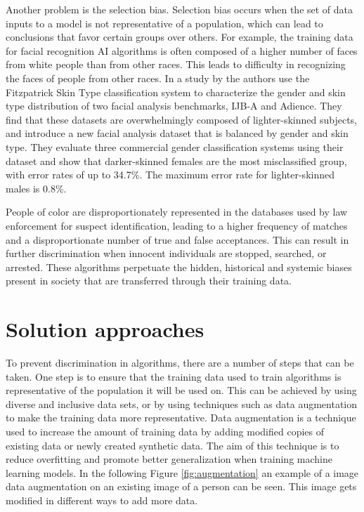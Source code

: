 \documentclass[
	12pt,
    a4paper,
    egregdoesnotlikesansseriftitles, %
    toc=chapterentrywithdots,
    oneside, openany,
    titlepage,
    parskip=half,
    headings=normal,  %
    listof=totoc,
    bibliography=totocnumbered,
    index=totoc,
    captions=tableheading,  %
    listof=flat,
    numbers=noenddot, %
    final]
    {scrbook}
\begin{document}
Another problem is the selection bias.
Selection bias occurs when the set of data inputs to a model is not representative of a population, which can lead to conclusions that favor certain groups over others. \cite[p. 8]{usa}
For example, the training data for facial recognition AI algorithms is often composed of a higher number of faces from white people than from other races. This leads to difficulty in recognizing the faces of people from other races.
In a study by \textcite{buolamwini_gender_2018} the authors use the Fitzpatrick Skin Type classification system to characterize the gender and skin type distribution of two facial analysis benchmarks, IJB-A and Adience. 
They find that these datasets are overwhelmingly composed of lighter-skinned subjects, and introduce a new facial analysis dataset that is balanced by gender and skin type. 
They evaluate three commercial gender classification systems using their dataset and show that darker-skinned females are the most misclassified group, with error rates of up to 34.7\%. 
The maximum error rate for lighter-skinned males is 0.8\%. 
\cite[p. 1]{buolamwini_gender_2018}


People of color are disproportionately represented in the databases used by law enforcement for suspect identification, leading to a higher frequency of matches and a disproportionate number of true and false acceptances. \cite[p. 323-324]{bacchini_race_2019}
This can result in further discrimination when innocent individuals are stopped, searched, or arrested. 
These algorithms perpetuate the hidden, historical and systemic biases present in society that are transferred through their training data. \cite[p. 8]{usa}



\chapter{Solution approaches}
To prevent discrimination in algorithms, there are a number of steps that can be taken. 
One step is to ensure that the training data used to train algorithms is representative of the population it will be used on. 
This can be achieved by using diverse and inclusive data sets, or by using techniques such as data augmentation to make the training data more representative.
Data augmentation is a technique used to increase the amount of training data by adding modified copies of existing data or newly created synthetic data.
The aim of this technique is to reduce overfitting and promote better generalization when training machine learning models. \cite[p. 2]{nanni2022feature}
In the following Figure \ref{fig:augmentation} an example of a image data augmentation on an existing image of a person can be seen. 
This image gets modified in different ways to add more data.
\end{document}
